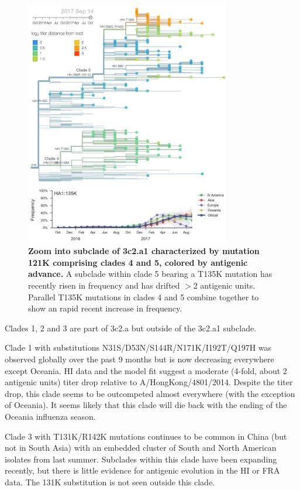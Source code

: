 \documentclass[11pt,oneside,letterpaper]{article}
\begin{document}
\begin{figure}[h!]
  \centering
  \includegraphics[width=0.8\textwidth]{../figures/sep-2017/h3n2_tree_135k.png}
  \caption{\textbf{Zoom into subclade of 3c2.a1 characterized by mutation 121K comprising clades 4 and 5, colored by antigenic advance.} A subclade within clade 5 bearing a T135K mutation has recently risen in frequency and has drifted $>$2 antigenic units.
  Parallel T135K mutations in clades 4 and 5 combine together to show an rapid recent increase in frequency.
  }
  \label{h3n2_tree_135k}
\end{figure}

Clades 1, 2 and 3 are part of 3c2.a but outside of the 3c2.a1 subclade.

Clade 1 with substitutions N31S/D53N/S144R/N171K/I192T/Q197H was observed globally over the past 9 months but is now decreasing everywhere except Oceania.
HI data and the model fit suggest a moderate (4-fold, about 2 antigenic units) titer drop relative to A/HongKong/4801/2014.
Despite the titer drop, this clade seems to be outcompeted almost everywhere (with the exception of Oceania).
It seems likely that this clade will die back with the ending of the Oceania influenza season.

Clade 3 with T131K/R142K mutations continues to be common in China (but
not in South Asia) with an embedded cluster of South and North American
isolates from last summer. Subclades within this clade have been
expanding recently, but there is little evidence for antigenic evolution
in the HI or FRA data. The 131K substitution is not seen outside this
clade.
\end{document}
